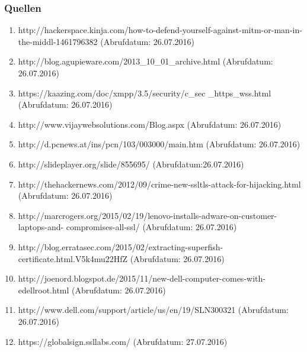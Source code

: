 \documentclass{beamer}
\begin{document}
    	\begin{frame}
    		\frametitle{Quellen}
    		\begin{tiny}
	    		\begin{enumerate}
		    		\item {http://hackerspace.kinja.com/how-to-defend-yourself-against-mitm-or-man-in-
	    			the-middl-1461796382 (Abrufdatum: 26.07.2016)}
	    			\item {http://blog.agupieware.com/2013\_10\_01\_archive.html (Abrufdatum: 26.07.2016)}
	    			\item {https://kaazing.com/doc/xmpp/3.5/security/c\_sec
	    				\_https\_wss.html} (Abrufdatum: 26.07.2016)
		    		\item {http://www.vijaywebsolutions.com/Blog.aspx (Abrufdatum: 26.07.2016)}
	    			\item {http://d.pcnews.at/ins/pcn/103/003000/main.htm (Abrufdatum: 26.07.2016)}
	    			\item {http://slideplayer.org/slide/855695/ (Abrufdatum:26.07.2016)}
	    			\item {http://thehackernews.com/2012/09/crime-new-ssltls-attack-for-hijacking.html \\(Abrufdatum: 26.07.2016)}
	    			\item {http://marcrogers.org/2015/02/19/lenovo-installs-adware-on-customer-laptops-and-
	    				compromises-all-ssl/ (Abrufdatum: 26.07.2016)}
	    			\item {http://blog.erratasec.com/2015/02/extracting-superfish-certificate.html.V5k4mu22HfZ (Abrufdatum: 26.07.2016)}
	    			\item {http://joenord.blogspot.de/2015/11/new-dell-computer-comes-with-edellroot.html (Abrufdatum: 26.07.2016)}
	    			\item {http://www.dell.com/support/article/us/en/19/SLN300321 (Abrufdatum: 26.07.2016)}
	    			\item {https://globalsign.ssllabs.com/ (Abrufdatum: 27.07.2016)}
	    		\end{enumerate}
    		\end{tiny}
    	\end{frame}    
\end{document}
